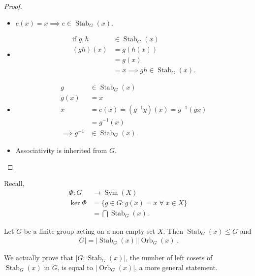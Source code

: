 \begin{proof} ~
    \begin{itemize} 
        \item $e(x) = x \implies e \in \operatorname{Stab}_G(x)$.
        \item \begin{align*}
            \text{if } g, h &\in \operatorname{Stab}_G(x) \\
            (gh)(x) &= g(h(x)) \\
            &= g(x) \\
            &= x \implies gh \in \operatorname{Stab}_G(x).
            \end{align*} 
        \item \begin{align*}
            g &\in \operatorname{Stab}_G(x) \\
            g(x) &= x \\
            x &= e(x) = (g^{-1} g)(x) = g^{-1}(gx) \\
            &= g^{-1}(x) \\
            \implies g^{-1} &\in \operatorname{Stab}_G(x).
        \end{align*} 
        \item Associativity is inherited from $G$.
    \end{itemize} 
\end{proof} 

\begin{remark} 
    Recall,  \begin{align*}
        \Phi : G &\to \operatorname{Sym}(X) \\
        \ker \Phi &= \{ g \in G : g(x) = x \; \forall \; x \in X \} \\
        &= \bigcap \operatorname{Stab}_G(x).
    \end{align*}
\end{remark} 

\begin{theorem} \label{thm:orbit}
    Let $G$ be a finite group acting on a non-empty set $X$.
    Then $\operatorname{Stab}_G(x) \leq G$ and 
    \begin{align*}
        |G| = |\operatorname{Stab}_G(x)| |\operatorname{Orb}_G(x)|.
    \end{align*} 
\end{theorem} 

\begin{remark}
    We actually prove that $|G : \operatorname{Stab}_G(x)|$, the number of left cosets of $\operatorname{Stab}_G(x)$ in $G$, is equal to $|\operatorname{Orb}_G(x)|$, a more general statement.
\end{remark} 


